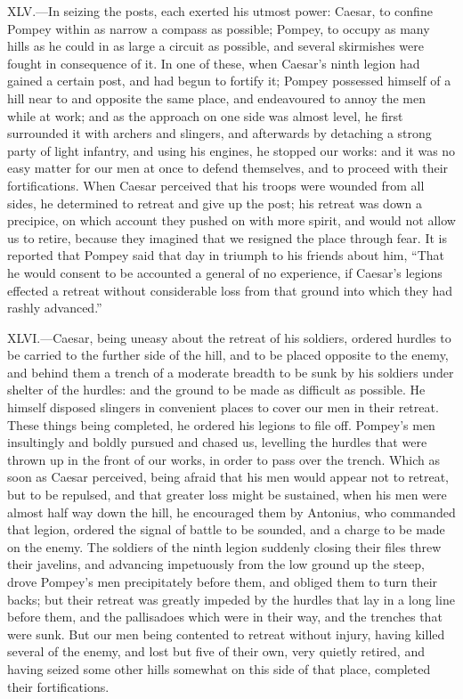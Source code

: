 XLV.—In seizing the posts, each exerted his utmost power: Caesar, to
confine Pompey within as narrow a compass as possible; Pompey, to occupy
as many hills as he could in as large a circuit as possible, and several
skirmishes were fought in consequence of it. In one of these, when
Caesar's ninth legion had gained a certain post, and had begun to
fortify it; Pompey possessed himself of a hill near to and opposite the
same place, and endeavoured to annoy the men while at work; and as the
approach on one side was almost level, he first surrounded it with
archers and slingers, and afterwards by detaching a strong party of
light infantry, and using his engines, he stopped our works: and it was
no easy matter for our men at once to defend themselves, and to proceed
with their fortifications. When Caesar perceived that his troops were
wounded from all sides, he determined to retreat and give up the post;
his retreat was down a precipice, on which account they pushed on with
more spirit, and would not allow us to retire, because they imagined
that we resigned the place through fear. It is reported that Pompey said
that day in triumph to his friends about him, ``That he would consent to
be accounted a general of no experience, if Caesar's legions effected a
retreat without considerable loss from that ground into which they had
rashly advanced.''

XLVI.—Caesar, being uneasy about the retreat of his soldiers, ordered
hurdles to be carried to the further side of the hill, and to be placed
opposite to the enemy, and behind them a trench of a moderate breadth to
be sunk by his soldiers under shelter of the hurdles: and the ground to
be made as difficult as possible. He himself disposed slingers in
convenient places to cover our men in their retreat. These things being
completed, he ordered his legions to file off. Pompey's men insultingly
and boldly pursued and chased us, levelling the hurdles that were thrown
up in the front of our works, in order to pass over the trench. Which as
soon as Caesar perceived, being afraid that his men would appear not to
retreat, but to be repulsed, and that greater loss might be sustained,
when his men were almost half way down the hill, he encouraged them by
Antonius, who commanded that legion, ordered the signal of battle to be
sounded, and a charge to be made on the enemy. The soldiers of the ninth
legion suddenly closing their files threw their javelins, and advancing
impetuously from the low ground up the steep, drove Pompey's men
precipitately before them, and obliged them to turn their backs; but
their retreat was greatly impeded by the hurdles that lay in a long line
before them, and the pallisadoes which were in their way, and the
trenches that were sunk. But our men being contented to retreat without
injury, having killed several of the enemy, and lost but five of their
own, very quietly retired, and having seized some other hills somewhat
on this side of that place, completed their fortifications.

